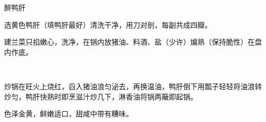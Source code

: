 \begin{recipe}{醉鸭肝}

\ingredients


\preparation

\step 选黄色鸭肝（填鸭肝最好）清洗干净，用刀对剖，每副共成四瓣。

\step 建兰菜只掐嫩心，洗净，在锅内放猪油、料酒、盐（少许）煸熟（保持脆性）在盘
内作底。

\step 𰪿糟浮子、甜酱、酱油、胡椒面、白糖、味精、水亘粉及清汤少许兑成滋汁。

\step 炒锅在旺火上烧红，舀入猪油浪匀泌去，再换温油，鸭肝倒下用瓢子轻轻将油浪转
炒匀，鸭肝快熟时即烹滋汁炒几下，淋香油将锅两簸即起锅。

\features

色泽金黄，鲜嫩适口，甜咸中带有糟味。

\end{recipe}


